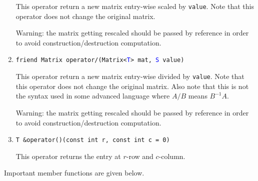 \documentclass[11pt,a4paper]{article}
\newcommand{\ttype}[1]{\textcolor{blue}{\texttt{#1}}}
\theoremstyle{definition}
\theoremstyle{definition}
\numberwithin{equation}{section}
\begin{document}
\begin{enumerate}
		This operator return a new matrix entry-wise scaled by \texttt{value}. Note that this operator does not change the original matrix.
		
		Warning: the matrix getting rescaled should be passed by reference in order to avoid construction/destruction computation.
		
		\item \texttt{friend Matrix operator/(Matrix<\ttype{T}> mat, \ttype{S} value)}
		
		This operator return a new matrix entry-wise divided by \texttt{value}. Note that this operator does not change the original matrix. Also note that this is not the syntax used in some advanced language where $A/B$ means $B^{-1}A$.
		
		Warning: the matrix getting rescaled should be passed by reference in order to avoid construction/destruction computation.
		
		\item \texttt{T \&operator()(const int r, const int c = 0)}
		
		This operator returns the entry at $r$-row and $c$-column.
		
	\end{enumerate}

	Important member functions are given below.
	
\end{document}
